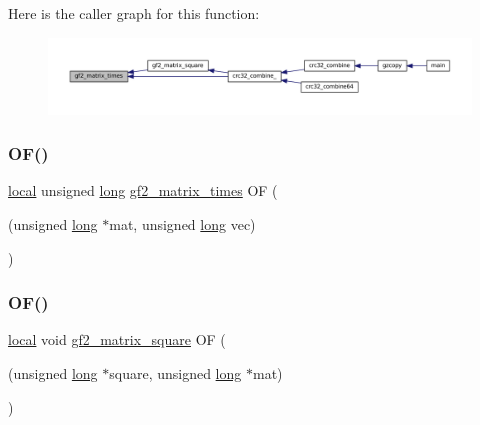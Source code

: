 Here is the caller graph for this function\+:
\nopagebreak
\begin{figure}[H]
\begin{center}
\leavevmode
\includegraphics[width=350pt]{third-party_2zlib_2crc32_8c_a388bdea9cd672b42ff9d424c3357a71c_icgraph}
\end{center}
\end{figure}
\mbox{\label{third-party_2zlib_2crc32_8c_ab5e9ce61df5c0090a4c91ed4df20bd15}} 
\subsubsection{\texorpdfstring{O\+F()}{OF()}\hspace{0.1cm}{\footnotesize\ttfamily [1/3]}}
{\footnotesize\ttfamily \mbox{\hyperlink{zutil_8h_a08023ea6765c99d60a6a3840cd07156e}{local}} unsigned \mbox{\hyperlink{ioapi_8h_a3c7b35ad9dab18b8310343c201f7b27e}{long}} \mbox{\hyperlink{third-party_2zlib_2crc32_8c_a388bdea9cd672b42ff9d424c3357a71c}{gf2\+\_\+matrix\+\_\+times}} OF (\begin{DoxyParamCaption}\item[{(unsigned \mbox{\hyperlink{ioapi_8h_a3c7b35ad9dab18b8310343c201f7b27e}{long}} $\ast$mat, unsigned \mbox{\hyperlink{ioapi_8h_a3c7b35ad9dab18b8310343c201f7b27e}{long}} vec)}]{ }\end{DoxyParamCaption})}

\mbox{\label{third-party_2zlib_2crc32_8c_a97302400540a4804a933ce8f829f1517}} 
\subsubsection{\texorpdfstring{O\+F()}{OF()}\hspace{0.1cm}{\footnotesize\ttfamily [2/3]}}
{\footnotesize\ttfamily \mbox{\hyperlink{zutil_8h_a08023ea6765c99d60a6a3840cd07156e}{local}} void \mbox{\hyperlink{third-party_2zlib_2crc32_8c_a797362ba54180ad549b381abfcde80c3}{gf2\+\_\+matrix\+\_\+square}} OF (\begin{DoxyParamCaption}\item[{(unsigned \mbox{\hyperlink{ioapi_8h_a3c7b35ad9dab18b8310343c201f7b27e}{long}} $\ast$square, unsigned \mbox{\hyperlink{ioapi_8h_a3c7b35ad9dab18b8310343c201f7b27e}{long}} $\ast$mat)}]{ }\end{DoxyParamCaption})}

